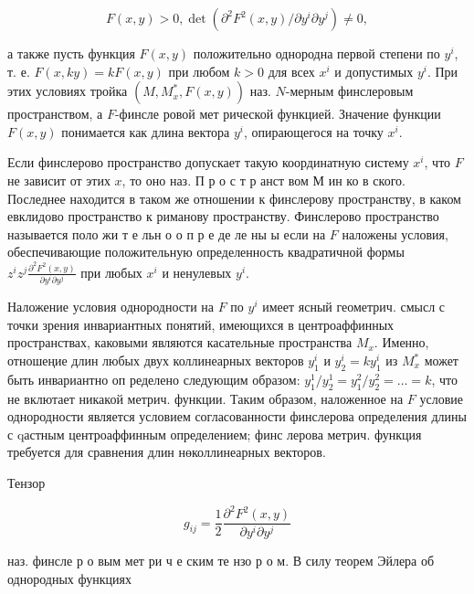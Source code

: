 \documentclass[10pt]{article}
\begin{document}
\[

F(x, y)>0, \operatorname{det}\left(\partial^{2} F^{2}(x, y) / \partial y^{i} \partial y^{j}\right) \neq 0,

\]



а также пусть функция $F(x, y)$ положительно однородна первой степени по $y^{i}$, т. е. $F(x, k y)=k F(x, y)$ при любом $k>0$ для всех $x^{i}$ и допустимых $y^{i}$. При этих условиях тройка $\left(M, M_{x}^{*}, F(x, y)\right)$ наз. $N$-мерным финслеровым пространством, а $F$-финсле ровой мет рической функцией. Значение функции $F(x, y)$ понимается как длина вектора $y^{i}$, опирающегося на точку $x^{i}$.



Если финслерово пространство допускает такую координатную систему $x^{i}$, что $F$ не зависит от этих $x$, то оно наз. П р о с т р анст вом М ин ко в ского. Последнее находится в таком же отношении к финслерову пространству, в каком евклидово пространство к риманову пространству. Финслерово пространство называется поло жи т е льн о о п р е де ле ны ы если на $F$ наложены условия, обеспечивающие положительную определенность квадратичной формы $z^{i} z^{j} \frac{\partial^{2} F^{2}(x, y)}{\partial y^{i} \partial y^{j}}$ при любых $x^{i}$ и ненулевых $y^{i}$.



Наложение условия однородности на $F$ по $y^{i}$ имеет ясный геометрич. смысл с точки зрения инвариантных понятий, имеющихся в центроаффинных пространствах, каковыми являются касательные пространства $M_{x}$. Именно, отношеңие длин любых двух коллинеарных векторов $y_{1}^{i}$ и $y_{2}^{i}=k y_{1}^{i}$ из $M_{x}^{*}$ может быть инвариантно оп ределено следующим образом: $y_{1}^{1} / y_{2}^{1}=y_{1}^{2} / y_{2}^{2}=\ldots=k$, что не вклютает никакой метрич. функции. Таким образом, наложенное на $F$ условие однородности является условием согласованности финслерова определения длины с qастным центроаффинным определением; финс лерова метрич. функция требуется для сравнения длин нөколлинеарных векторов.



Тензор



\[

g_{i j}=\frac{1}{2} \frac{\partial^{2} F^{2}(x, y)}{\partial y^{i} \partial y^{j}}

\]



наз. финсле р о вым мет ри ч е ским те нзо р о м. В силу теорем Эйлера об однородных функциях
\end{document}
